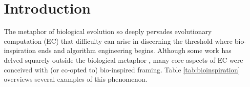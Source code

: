 %

\section{Introduction} \label{sec:introduction}

The metaphor of biological evolution so deeply pervades evolutionary computation (EC) that difficulty can arise in discerning the threshold where bio-inspiration ends and algorithm engineering begins.
Although some work has delved squarely outside the biological metaphor \citep{hansen2001completely,munteanu1999improving,miller2015cartesian}, many core aspects of EC were conceived with (or co-opted to) bio-inspired framing.
Table \ref{tab:bioinspiration} overviews several examples of this phenomenon.




